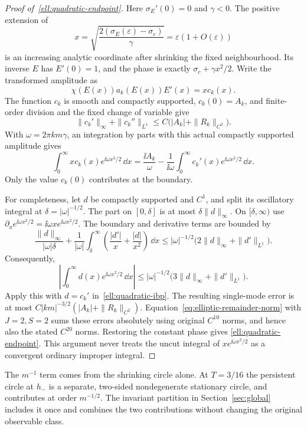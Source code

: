 \begin{proof}[Proof of~\eqref{ell:quadratic-endpoint}]
Here $\sigma_E'(0)=0$ and $\gamma<0$.  The positive extension of
\[
 x=\sqrt{\frac{2(\sigma_E(\varepsilon)-\sigma_c)}{\gamma}}
   =\varepsilon(1+O(\varepsilon))
\]
is an increasing analytic coordinate after shrinking the fixed
neighbourhood.  Its inverse $E$ has $E'(0)=1$, and the phase is exactly
$\sigma_c+\gamma x^2/2$.  Write the transformed amplitude as
\[
 \chi(E(x))a_k(E(x))E'(x)=x c_k(x).
\]
The function $c_k$ is smooth and compactly supported,
$c_k(0)=A_k$, and finite-order division and the fixed change of variable
give
\begin{equation}\label{ell:quadratic-amplitude-bound}
 \|c_k'\|_\infty+\|c_k''\|_{L^1}
 \leq C\bigl(|A_k|+\|R_k\|_{C^2}\bigr).
\end{equation}
With $\omega=2\pi km\gamma$, an integration by parts with this actual
compactly supported amplitude gives
\begin{equation}\label{ell:quadratic-ibp}
 \int_0^\infty xc_k(x)e^{\ii\omega x^2/2}\,\dd x
 =\frac{\ii A_k}{\omega}
  -\frac1{\ii\omega}\int_0^\infty
        c_k'(x)e^{\ii\omega x^2/2}\,\dd x.
\end{equation}
Only the value $c_k(0)$ contributes at the boundary.

For completeness, let $d$ be compactly supported and $C^1$, and split
its oscillatory integral at $\delta=|\omega|^{-1/2}$.
The part on $[0,\delta]$ is at most
$\delta\|d\|_\infty$.  On $[\delta,\infty)$ use
$\partial_xe^{\ii\omega x^2/2}=\ii\omega x e^{\ii\omega x^2/2}$.
The boundary and derivative terms are bounded by
\[
 \frac{\|d\|_\infty}{|\omega|\delta}
 +\frac1{|\omega|}\int_\delta^\infty
      \left(\frac{|d'|}{x}+\frac{|d|}{x^2}\right)\,\dd x
 \leq |\omega|^{-1/2}
       \bigl(2\|d\|_\infty+\|d'\|_{L^1}\bigr).
\]
Consequently,
\begin{equation}\label{ell:quadratic-remainder}
 \left|\int_0^\infty d(x)e^{\ii\omega x^2/2}\,\dd x\right|
 \leq |\omega|^{-1/2}
       \bigl(3\|d\|_\infty+\|d'\|_{L^1}\bigr).
\end{equation}
Apply this with $d=c_k'$ in~\eqref{ell:quadratic-ibp}.  The resulting
single-mode error is at most
$C|km|^{-3/2}(|A_k|+\|R_k\|_{C^2})$.
Equation~\eqref{eq:elliptic-remainder-norm} with $J=2,S=2$ sums these
errors absolutely using original $C^{10}$ norms, and hence also the
stated $C^{20}$ norms.  Restoring the constant phase gives
\eqref{ell:quadratic-endpoint}.  This argument never treats the
uncut integral of $xe^{\ii\omega x^2/2}$ as a convergent ordinary
improper integral.
\end{proof}

The $m^{-1}$ term comes from the shrinking circle alone.  At $T=3/16$
the persistent circle at $h_-$ is a separate, two-sided nondegenerate
stationary circle, and contributes at order $m^{-1/2}$.  The invariant
partition in Section~\ref{sec:global} includes it once and combines the
two contributions without changing the original observable class.
